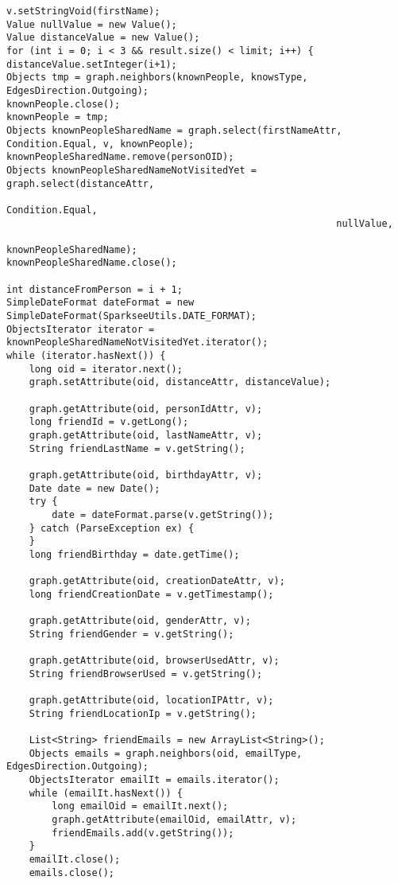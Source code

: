 {\begin{verbatim}
v.setStringVoid(firstName); 
Value nullValue = new Value(); 
Value distanceValue = new Value(); 
for (int i = 0; i < 3 && result.size() < limit; i++) { 
distanceValue.setInteger(i+1); 
Objects tmp = graph.neighbors(knownPeople, knowsType, EdgesDirection.Outgoing); 
knownPeople.close(); 
knownPeople = tmp; 
Objects knownPeopleSharedName = graph.select(firstNameAttr, Condition.Equal, v, knownPeople); 
knownPeopleSharedName.remove(personOID); 
Objects knownPeopleSharedNameNotVisitedYet = graph.select(distanceAttr, 
                                                          Condition.Equal, 
                                                          nullValue, 
                                                          knownPeopleSharedName); 
knownPeopleSharedName.close(); 

int distanceFromPerson = i + 1; 
SimpleDateFormat dateFormat = new SimpleDateFormat(SparkseeUtils.DATE_FORMAT); 
ObjectsIterator iterator = knownPeopleSharedNameNotVisitedYet.iterator(); 
while (iterator.hasNext()) { 
    long oid = iterator.next(); 
    graph.setAttribute(oid, distanceAttr, distanceValue); 

    graph.getAttribute(oid, personIdAttr, v); 
    long friendId = v.getLong();  
    graph.getAttribute(oid, lastNameAttr, v); 
    String friendLastName = v.getString(); 

    graph.getAttribute(oid, birthdayAttr, v); 
    Date date = new Date(); 
    try { 
        date = dateFormat.parse(v.getString()); 
    } catch (ParseException ex) { 
    } 
    long friendBirthday = date.getTime(); 

    graph.getAttribute(oid, creationDateAttr, v); 
    long friendCreationDate = v.getTimestamp(); 

    graph.getAttribute(oid, genderAttr, v); 
    String friendGender = v.getString(); 

    graph.getAttribute(oid, browserUsedAttr, v); 
    String friendBrowserUsed = v.getString(); 

    graph.getAttribute(oid, locationIPAttr, v); 
    String friendLocationIp = v.getString(); 

    List<String> friendEmails = new ArrayList<String>(); 
    Objects emails = graph.neighbors(oid, emailType, EdgesDirection.Outgoing); 
    ObjectsIterator emailIt = emails.iterator(); 
    while (emailIt.hasNext()) {
        long emailOid = emailIt.next();
        graph.getAttribute(emailOid, emailAttr, v);
        friendEmails.add(v.getString());
    }
    emailIt.close();
    emails.close();


\end{verbatim}}
